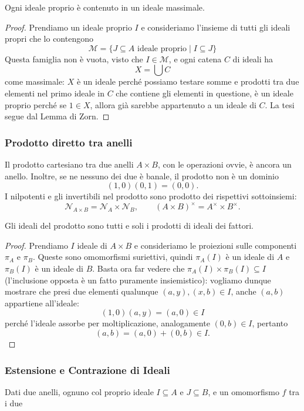 \begin{multicols}{2}
\begin{prop}\label{idmax}
	Ogni ideale proprio è contenuto in un ideale massimale.
\end{prop}
\begin{proof}
	Prendiamo un ideale proprio $ I $ e consideriamo l'insieme di tutti gli ideali propri che lo contengono
	\[ \mathcal{M} = \{ J \subseteq A \text{ ideale proprio} \mid I \subseteq J \} \]
	Questa famiglia non è vuota, visto che $ I \in \mathcal{M} $, e ogni catena $ C $ di ideali ha 
	\[ X = \bigcup C \]
	come massimale: $ X $ è un ideale perché possiamo testare somme e prodotti tra due elementi nel primo ideale in $ C $ che contiene gli elementi in questione, è un ideale proprio perché se $ 1 \in  X $, allora già sarebbe appartenuto a un ideale di $ C $. La tesi segue dal Lemma di Zorn.
\end{proof}
	

\subsubsection{Prodotto diretto tra anelli} Il prodotto cartesiano tra due anelli $ A \times B $, con le operazioni ovvie, è ancora un anello. Inoltre, se ne nessuno dei due è banale, il prodotto non è un dominio \[ (1, 0)(0, 1) = (0, 0). \] I nilpotenti e gli invertibili nel prodotto sono prodotto dei rispettivi sottoinsiemi:
\[ \mathcal{N}_{A \times B} = \mathcal{N}_A \times \mathcal{N}_B, \qquad (A\times B)^\times = A^\times \times B^\times. \]

\begin{prop}
Gli ideali del prodotto sono tutti e soli i prodotti di ideali dei fattori.
\end{prop}
\begin{proof}
	Prendiamo $ I $ ideale di $ A \times B $ e consideriamo le proiezioni sulle componenti $ \pi_A $ e $ \pi_B $. Queste sono omomorfismi suriettivi, quindi $ \pi_A(I) $ è un ideale di $ A $ e $ \pi_B(I) $ è un ideale di $ B $. Basta ora far vedere che $ \pi_A(I) \times \pi_B(I) \subseteq I $ (l'inclusione opposta è un fatto puramente insiemistico): vogliamo dunque mostrare che presi due elementi qualunque $ (a, y), (x, b) \in I $, anche $ (a, b) $ appartiene all'ideale: $$  (1, 0)(a, y) = (a, 0) \in I  $$ perché l'ideale assorbe per moltiplicazione, analogamente $ (0, b) \in I $, pertanto
	\[ (a, b) = (a, 0) + (0, b) \in I. \]
\end{proof}
 

\subsubsection{Estensione e Contrazione di Ideali} Dati due anelli, ognuno col proprio ideale $ I \subseteq A $ e $ J  \subseteq B $, e un omomorfismo $ f $ tra i due


\end{multicols}
